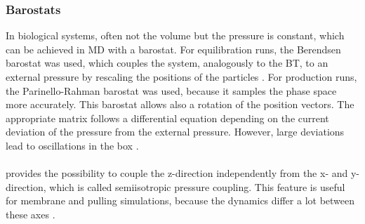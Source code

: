 \subsubsection{Barostats}
In biological systems, often not the volume but the pressure is constant, which can be achieved in MD with a barostat. For equilibration runs, the Berendsen barostat \autocite{berendsen} was used, which couples the system, analogously to the BT, to an external pressure by rescaling the positions of the particles \autocite[p. 36]{gromacsManual}. For production runs, the Parinello-Rahman barostat \autocites{parinelloBarostat}{parinelloBarostat2} was used, because it samples the phase space more accurately. This barostat allows also a rotation of the position vectors. The appropriate matrix follows a differential equation depending on the current deviation of the pressure from the external pressure. However, large deviations lead to oscillations in the box \autocite[p. 36]{gromacsManual}.\\
\\
\gromacs{} provides the possibility to couple the z-direction independently from the x- and y-direction, which is called semiisotropic pressure coupling. This feature is useful for membrane and pulling simulations, because the dynamics differ a lot between these axes \autocite[p. 36]{gromacsManual}.